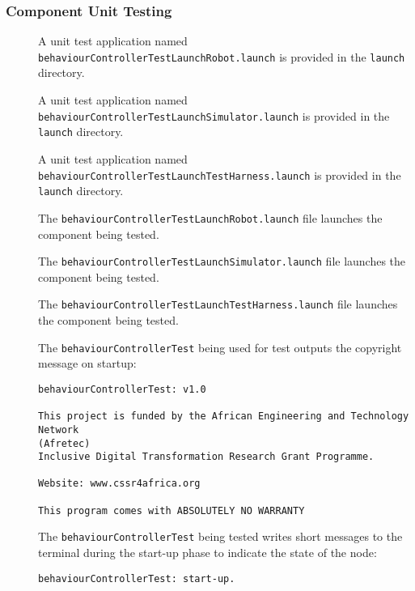\documentclass{CSSRforAfrica}
\newcommand{\checkboxChecked}{\fbox{\ding{51}}} %
\newcommand{\checkboxDashed}{\fbox{--}}         %
\begin{document}
\subsubsection{Component Unit Testing}
\label{subsubsection:behaviour_controller_test_unit_testing}


\begin{description}
\item[\checkboxChecked] A unit test application named {\small \verb+behaviourControllerTestLaunchRobot.launch+} is provided in the {\small \verb+launch+} directory. 

\item[\checkboxDashed] A unit test application named {\small \verb+behaviourControllerTestLaunchSimulator.launch+} is provided in the {\small \verb+launch+} directory. 

\item[\checkboxChecked] A unit test application named {\small \verb+behaviourControllerTestLaunchTestHarness.launch+} is provided in the {\small \verb+launch+} directory. 

\item[\checkboxChecked] The {\small \verb+behaviourControllerTestLaunchRobot.launch+} file  launches the component being tested.

\item[\checkboxDashed] The {\small \verb+behaviourControllerTestLaunchSimulator.launch+} file  launches the component being tested.

\item[\checkboxChecked] The {\small \verb+behaviourControllerTestLaunchTestHarness.launch+} file  launches the component being tested.

\newpage
\item[\checkboxChecked]  The {\small \verb+behaviourControllerTest+} being used for test outputs the copyright message on startup:
\begin{verbatim}
behaviourControllerTest: v1.0
 
This project is funded by the African Engineering and Technology Network 
(Afretec) 
Inclusive Digital Transformation Research Grant Programme.
 
Website: www.cssr4africa.org
 
This program comes with ABSOLUTELY NO WARRANTY
\end{verbatim}

\item[\checkboxChecked]  The {\small \verb+behaviourControllerTest+} being tested writes short messages to the terminal during the start-up phase to
 indicate the state of the node:
\begin{verbatim}
behaviourControllerTest: start-up.
\end{verbatim}


\end{description}
\end{document}
